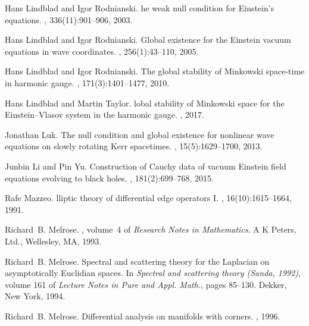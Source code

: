 \documentclass[reqno,11pt,letterpaper]{amsart}
\numberwithin{equation}{section}
\numberwithin{figure}{section}
\theoremstyle{definition}
\theoremstyle{remark}
\begin{document}
\begin{thebibliography}{GCHMG05}
Hans Lindblad and Igor Rodnianski.
he weak null condition for {E}instein's equations.
, 336(11):901--906, 2003.

Hans Lindblad and Igor Rodnianski.
\newblock Global existence for the {E}instein vacuum equations in wave
  coordinates.
, 256(1):43--110, 2005.

Hans Lindblad and Igor Rodnianski.
\newblock The global stability of {M}inkowski space-time in harmonic gauge.
, 171(3):1401--1477, 2010.

Hans Lindblad and Martin Taylor.
lobal stability of {M}inkowski space for the {E}instein--{V}lasov
  system in the harmonic gauge.
, 2017.

Jonathan Luk.
\newblock The null condition and global existence for nonlinear wave equations
  on slowly rotating {K}err spacetimes.
, 15(5):1629--1700,
  2013.

Junbin Li and Pin Yu.
\newblock Construction of {C}auchy data of vacuum {E}instein field equations
  evolving to black holes.
, 181(2):699--768, 2015.

Rafe Mazzeo.
lliptic theory of differential edge operators {I}.
,
  16(10):1615--1664, 1991.

Richard~B. Melrose.
, volume~4 of
  {\em Research Notes in Mathematics}.
\newblock A K Peters, Ltd., Wellesley, MA, 1993.

Richard~B. Melrose.
\newblock Spectral and scattering theory for the {L}aplacian on asymptotically
  {E}uclidian spaces.
\newblock In {\em Spectral and scattering theory ({S}anda, 1992)}, volume 161
  of {\em Lecture Notes in Pure and Appl. Math.}, pages 85--130. Dekker, New
  York, 1994.

Richard~B. Melrose.
\newblock Differential analysis on manifolds with corners.
, 1996.


\end{thebibliography}
\end{document}
